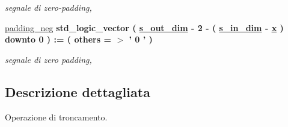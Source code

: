 \begin{DoxyCompactItemize}
\begin{DoxyCompactList}\small\item\em segnale di zero-\/padding, \end{DoxyCompactList}\item 
\hypertarget{group___truncation_ga130836df2917c4b75d1fc24500082e76}{\hyperlink{group___truncation_ga130836df2917c4b75d1fc24500082e76}{padding\+\_\+neg} {\bfseries \textcolor{vhdlchar}{std\+\_\+logic\+\_\+vector}\textcolor{vhdlchar}{ }\textcolor{vhdlchar}{(}\textcolor{vhdlchar}{ }\textcolor{vhdlchar}{ }\textcolor{vhdlchar}{ }\textcolor{vhdlchar}{ }{\bfseries \hyperlink{group___truncation_ga8b62f8bfecb0fab845995b8b051101bc}{s\+\_\+out\+\_\+dim}} \textcolor{vhdlchar}{-\/}\textcolor{vhdlchar}{ } \textcolor{vhdldigit}{2} \textcolor{vhdlchar}{-\/}\textcolor{vhdlchar}{ }\textcolor{vhdlchar}{(}\textcolor{vhdlchar}{ }\textcolor{vhdlchar}{ }\textcolor{vhdlchar}{ }\textcolor{vhdlchar}{ }{\bfseries \hyperlink{group___truncation_gad3d18243ad6fe53a2277e2aa9b94ca45}{s\+\_\+in\+\_\+dim}} \textcolor{vhdlchar}{-\/}\textcolor{vhdlchar}{ }\textcolor{vhdlchar}{ }\textcolor{vhdlchar}{ }{\bfseries \hyperlink{group___truncation_ga63701d8af27da7452a7588efcff357bc}{x}} \textcolor{vhdlchar}{ }\textcolor{vhdlchar}{)}\textcolor{vhdlchar}{ }\textcolor{vhdlchar}{ }\textcolor{vhdlchar}{downto}\textcolor{vhdlchar}{ }\textcolor{vhdlchar}{ } \textcolor{vhdldigit}{0} \textcolor{vhdlchar}{ }\textcolor{vhdlchar}{)}\textcolor{vhdlchar}{ }\textcolor{vhdlchar}{ }\textcolor{vhdlchar}{ }\textcolor{vhdlchar}{\+:}\textcolor{vhdlchar}{=}\textcolor{vhdlchar}{ }\textcolor{vhdlchar}{(}\textcolor{vhdlchar}{ }\textcolor{vhdlchar}{ }\textcolor{vhdlchar}{others}\textcolor{vhdlchar}{ }\textcolor{vhdlchar}{ }\textcolor{vhdlchar}{=}\textcolor{vhdlchar}{ }\textcolor{vhdlchar}{$>$}\textcolor{vhdlchar}{ }\textcolor{vhdlchar}{'}\textcolor{vhdlchar}{ } \textcolor{vhdldigit}{0} \textcolor{vhdlchar}{ }\textcolor{vhdlchar}{'}\textcolor{vhdlchar}{ }\textcolor{vhdlchar}{)}\textcolor{vhdlchar}{ }} }\label{group___truncation_ga130836df2917c4b75d1fc24500082e76}

\begin{DoxyCompactList}\small\item\em segnale di zero padding, \end{DoxyCompactList}\end{DoxyCompactItemize}


\subsection{Descrizione dettagliata}
Operazione di troncamento. 

